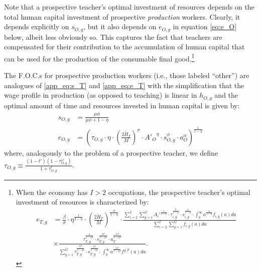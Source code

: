 \documentclass[onehalfspacing,11pt]{article}
\begin{document}
Note that a prospective teacher's optimal investment of resources depends on the total human capital investment of prospective {\it production} workers. Clearly, it depends explicitly on $s_{O,g}$, but it also depends on $e_{O,g}$ in equation \eqref{eq:e_O} below, albeit less obviously so. This captures the fact that teachers are compensated for their contribution to the accumulation of human capital that can be used for the production of the consumable final good.\footnote{When the economy has $I>2$ occupations, the prospective teacher's optimal investment of resources is characterized by:
\begin{align*}
e_{T,g} & = \tfrac{\beta}{\sigma}\cdot\eta^{\frac{1}{1-\eta}}\cdot \left(\tfrac{2\widetilde{H}_T}{M}\right)^{\frac{\sigma}{1-\eta}} \cdot \frac{\sum_{i=2}^I \sum_{g=1}^G {A_i'}^\frac{1}{1-\eta}\cdot\tau_{i,g}^\frac{\eta}{1-\eta} \cdot s_{i,g}^\frac{\phi}{1-\eta}\cdot \int_0^\infty a^{\frac{\alpha}{1-\eta}} f_{i,g}(a)da}{\sum_{i=2}^I \sum_{g=1}^G f_{i,g}(a)da} \nonumber\\
& \times \frac{\tau_{T,g}^\frac{\sigma}{\sigma-\eta\beta } \cdot s_{T,g}^\frac{\phi\beta }{\sigma-\eta\beta } \cdot a_T^\frac{\alpha\beta }{\sigma-\eta\beta }}{\sum_{g=1}^G \tau_{T,g}^\frac{\eta\beta }{\sigma-\eta\beta } \cdot s_{T,g}^\frac{\phi\beta }{\sigma-\eta\beta } \cdot \int_0^\infty a^\frac{\alpha\beta}{\sigma-\eta\beta } f^{g,T}(a)da}.
\end{align*}
}

The F.O.C.s for prospective production workers (i.e., those labeled ``other'') are analogues of \eqref{app_eq:s_T} and \eqref{app_eq:e_T} with the simplification that the wage profile in production (as opposed to teaching) is linear in $h_{O,g}$ and the optimal amount of time and resources invested in human capital is given by:
\begin{align}
s_{O,g} & = \frac{\mu \phi}{\mu \phi+1-\eta} \\
\label{eq:e_O}
e_{O,g} & = \left( \tau_{O,g} \cdot \eta \cdot \left(\tfrac{2\widetilde{H}_T}{M}\right)^\sigma\cdot {A'_{O}}^\eta \cdot s_{O,g}^\phi \cdot a_O^\alpha \right)^{\frac{1}{1-\eta}}
\end{align}
where, analogously to the problem of a prospective teacher, we define $\tau_{O,g} \equiv \frac{\left( 1-t' \right) \left( 1-\tau^{\omega '}_{O,g} \right)}{1+\tau^e_{O,g}}$.
\end{document}
